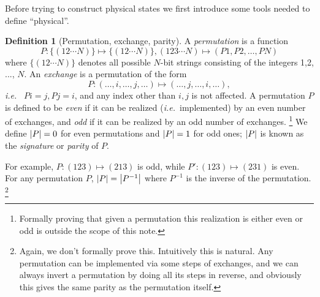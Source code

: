 \documentclass{article}
\theoremstyle{definition}
\newtheorem{dfn}{Definition}[section]
\theoremstyle{plain}
\numberwithin{equation}{section}
\begin{document}
Before trying to construct physical states we first introduce 
some tools needed to define ``physical''.

\begin{dfn}[Permutation, exchange, parity]
    A \emph{permutation} is a 
    function 
    \begin{equation}
        P: \{(12\cdots N)\} \mapsto \{(12\cdots N)\}, 
    (123\cdots N) \mapsto (P1, P2, \ldots ,PN)
    \end{equation}
    where $\{(12\cdots N)\}$ denotes all possible $N$-bit strings 
    consisting of the integers 1,2, ..., $N$. 
    An \emph{exchange} is a permutation of the form 
    \begin{equation}
        P: (\ldots ,i, \ldots ,j, \ldots )
        \mapsto 
        (\ldots ,j, \ldots ,i, \ldots ),
    \end{equation}
    \textit{i.e.}~ $Pi=j, Pj=i$, and 
    any index other than $i,j$ is not affected.
    A permutation $P$ is defined to be \emph{even} if 
    it can be realized (\textit{i.e.}~implemented) by an even number of 
    exchanges, and \emph{odd} if it can be realized by 
    an odd number of exchanges. 
    \footnote{Formally proving that given a permutation 
    this realization is either even or odd 
    is outside the scope of this note.}
    We define $\abs{P} = 0$ for even permutations 
    and $\abs{P} = 1$ for odd ones; $\abs{P}$ is known as 
    the \textit{signature} or \textit{parity} of $P$. 
\end{dfn}

    For example, 
    $P: (123) \mapsto (213)$ is odd, 
    while $P': (123) \mapsto (231)$ is even.
    For any permutation $P$, $\abs{P} = \abs{P ^{-1}}$ 
    where $P ^{-1}$ is the inverse of the permutation.
    \footnote{Again, we don't formally prove this. Intuitively 
    this is natural. Any permutation can be implemented 
    via some steps of exchanges, and we can always invert a permutation by 
    doing all its steps in reverse, and obviously this gives the 
    same parity as the permutation itself.}
\end{document}
